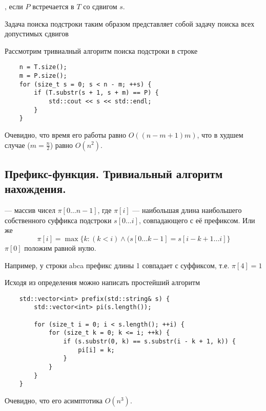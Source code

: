 \begin{definition}
	, если $P$ встречается в $T$ со сдвигом $s$.
\end{definition}

\begin{remark}
	Задача поиска подстроки таким образом представляет собой задачу поиска всех допустимых сдвигов
\end{remark}

Рассмотрим тривиалный алгоритм поиска подстроки в строке

\begin{lstlisting}
	n = T.size();
	m = P.size();
	for (size_t s = 0; s < n - m; ++s) {
		if (T.substr(s + 1, s + m) == P) {
			std::cout << s << std::endl;
		}
	}
\end{lstlisting}

\begin{remark}
	Очевидно, что время его работы равно $O((n - m + 1)m)$, что в худшем случае ($m = \frac{n}{2}$) равно
	$O(n^2)$.
\end{remark}

\subsection{Префикс-функция. Тривиальный алгоритм нахождения.}

\begin{definition}
	 --- массив чисел $\pi [0 \ldots n-1]$, где $\pi [i]$ --- наибольшая длина наибольшего
	собственного суффикса подстроки $s[0 \ldots i]$, совпадающего с её префиксом. Или же
	 \[
		 \pi[i] = \max \{ k \colon (k < i) \wedge (s[0 \ldots k-1] = s[i - k + 1 \ldots i] \}
	\]
	$\pi[0]$ положим равной нулю.
\end{definition}

Например, у строки abca префикс длины 1 совпадает с суффиксом, т.е. $\pi [4] = 1$

Исходя из определения можно написать простейший алгоритм

\begin{lstlisting}
	std::vector<int> prefix(std::string& s) {
		std::vector<int> pi(s.length());

		for (size_t i = 0; i < s.length(); ++i) {
			for (size_t k = 0; k <= i; ++k) {
				if (s.substr(0, k) == s.substr(i - k + 1, k)) {
					pi[i] = k;
				}
			}
		}
	}
\end{lstlisting}

\begin{remark}
	Очевидно, что его асимптотика $O(n^3)$.
\end{remark}


